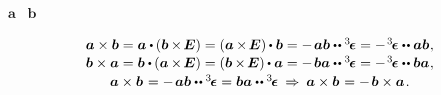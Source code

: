 \begin{otherlanguage}{russian}
\vspace{-0.1em} \noindent {} $\bm{a}$ ~$\bm{b}$

\nopagebreak\vspace{-0.1em}\begin{equation}\label{crossproductoftwovectors}
\begin{array}{c}
\bm{a} \times \bm{b} = \bm{a} \dotp \hspace{-0.1ex} \left( \bm{b} \hspace{-0.1ex} \times \hspace{-0.25ex} \bm{E} \right) = \left( \bm{a} \hspace{-0.1ex} \times \hspace{-0.25ex} \bm{E} \right) \hspace{-0.1ex} \dotp \bm{b} = - \hspace{.25ex} \bm{a} \bm{b} \dotdotp \levicivitatensor = - \hspace{.2ex} \levicivitatensor \dotdotp \bm{a} \bm{b} \hspace{.1ex},
\\[.1em]
%
\bm{b} \times \bm{a} = \bm{b} \dotp \hspace{-0.1ex} \left( \bm{a} \hspace{-0.1ex} \times \hspace{-0.25ex} \bm{E} \right) = \left( \bm{b} \hspace{-0.1ex} \times \hspace{-0.25ex} \bm{E} \right)  \hspace{-0.1ex} \dotp \bm{a} = - \hspace{.25ex} \bm{b} \bm{a} \dotdotp \levicivitatensor = - \hspace{.2ex} \levicivitatensor \dotdotp \bm{b} \bm{a} \hspace{.1ex},
\\[.15em]
%
\bm{a} \times \bm{b} \hspace{.16ex} = - \hspace{.25ex} \bm{a} \bm{b} \dotdotp \levicivitatensor = \bm{b} \bm{a} \dotdotp \levicivitatensor
\:\Rightarrow\:
\bm{a} \times \bm{b} \hspace{.16ex} = - \hspace{.25ex} \bm{b} \times \bm{a} \hspace{.2ex}.
\end{array}
\end{equation}


\end{otherlanguage}
